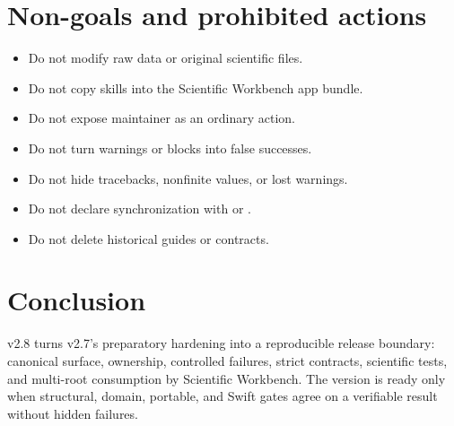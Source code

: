 \documentclass[11pt,a4paper]{article}
\newcommand{\code}[1]{\texttt{\detokenize{#1}}}
\begin{document}
\section{Non-goals and prohibited actions}
\begin{itemize}[leftmargin=1.5em]
\item Do not modify raw data or original scientific files.
\item Do not copy skills into the Scientific Workbench app bundle.
\item Do not expose maintainer as an ordinary action.
\item Do not turn warnings or blocks into false successes.
\item Do not hide tracebacks, nonfinite values, or lost warnings.
\item Do not declare synchronization with \code{FAIL} or \code{ROTO}.
\item Do not delete historical guides or contracts.
\end{itemize}

\section{Conclusion}

v2.8 turns v2.7's preparatory hardening into a reproducible release boundary:
canonical surface, ownership, controlled failures, strict contracts, scientific
tests, and multi-root consumption by Scientific Workbench. The version is ready
only when structural, domain, portable, and Swift gates agree on a verifiable
result without hidden failures.
\end{document}
